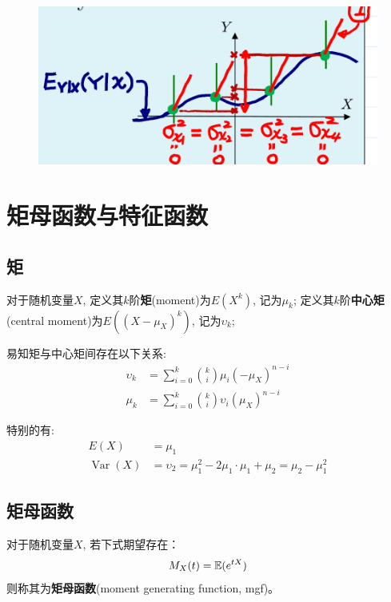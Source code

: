 \begin{figure}
    \centering
    \includegraphics{image/var_dec3.png}
\end{figure}

\section{矩母函数与特征函数}

\subsection{矩}

\begin{definition}
    对于随机变量$X$, 定义其$k$阶\textbf{矩}(moment)为$E(X^k)$, 记为$\mu_k$; 定义其$k$阶\textbf{中心矩}(central moment)为$E((X-\mu_X)^k)$, 记为$\upsilon_k$;
\end{definition}

易知矩与中心矩间存在以下关系:
\begin{align*}
    \upsilon_k & =\sum_{i=0}^k \binom{k}{i} \mu_i (-\mu_X)^{n-i}     \\
    \mu_k      & =\sum_{i=0}^k \binom{k}{i} \upsilon_i (\mu_X)^{n-i}
\end{align*}

特别的有:
\begin{align*}
    E(X)                  & =\mu_1                                                         \\
    \operatorname{Var}(X) & =\upsilon_2=\mu_1^2-2\mu_1 \cdot \mu_1 + \mu_2 = \mu_2-\mu_1^2
\end{align*}

\subsection{矩母函数}

\begin{definition}
    对于随机变量$X$, 若下式期望存在：
    \[ M_X(t) = \mathbb{E}(e^{tX}) \]
    则称其为\textbf{矩母函数}(moment generating function, mgf)。
\end{definition}

